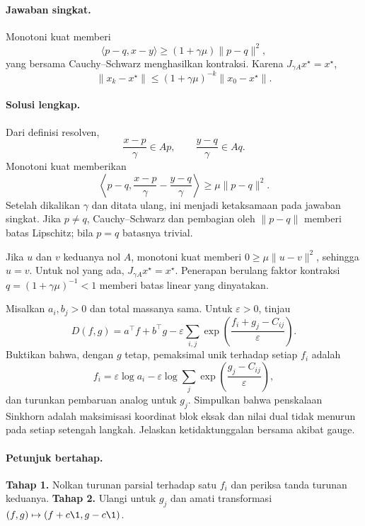 \paragraph{Jawaban singkat.}
\label{orig03:final:answer:0006}
Monotoni kuat memberi
\[
 \langle p-q,x-y\rangle\ge(1+\gamma\mu)\lVert p-q\rVert^2,
\]
yang bersama Cauchy--Schwarz menghasilkan kontraksi. Karena
$J_{\gamma A}x^\star=x^\star$,
\[
 \lVert x_k-x^\star\rVert
 \le(1+\gamma\mu)^{-k}\lVert x_0-x^\star\rVert.
\]

\paragraph{Solusi lengkap.}
\label{orig03:final:solution:0006}
Dari definisi resolven,
\[
 \frac{x-p}{\gamma}\in Ap,
 \qquad
 \frac{y-q}{\gamma}\in Aq.
\]
Monotoni kuat memberikan
\[
 \left\langle p-q,\frac{x-p}{\gamma}-\frac{y-q}{\gamma}\right\rangle
 \ge\mu\lVert p-q\rVert^2.
\]
Setelah dikalikan $\gamma$ dan ditata ulang, ini menjadi ketaksamaan pada
jawaban singkat. Jika $p\ne q$, Cauchy--Schwarz dan pembagian oleh
$\lVert p-q\rVert$ memberi batas Lipschitz; bila $p=q$ batasnya trivial.

Jika $u$ dan $v$ keduanya nol $A$, monotoni kuat memberi
$0\ge\mu\lVert u-v\rVert^2$, sehingga $u=v$. Untuk nol yang ada,
$J_{\gamma A}x^\star=x^\star$. Penerapan berulang faktor kontraksi
$q=(1+\gamma\mu)^{-1}<1$ memberi batas linear yang dinyatakan.

\begin{exercise}
\label{orig03:final:exercise:0007}
Misalkan $a_i,b_j>0$ dan total massanya sama. Untuk $\varepsilon>0$, tinjau
\[
 D(f,g)=a^\top f+b^\top g
 -\varepsilon\sum_{i,j}
 \exp\!\left(\frac{f_i+g_j-C_{ij}}{\varepsilon}\right).
\]
Buktikan bahwa, dengan $g$ tetap, pemaksimal unik terhadap setiap $f_i$ adalah
\[
 f_i=\varepsilon\log a_i-\varepsilon
 \log\sum_j\exp\!\left(\frac{g_j-C_{ij}}{\varepsilon}\right),
\]
dan turunkan pembaruan analog untuk $g_j$. Simpulkan bahwa penskalaan Sinkhorn
adalah maksimisasi koordinat blok eksak dan nilai dual tidak menurun pada
setiap setengah langkah. Jelaskan ketidaktunggalan bersama akibat gauge.
\end{exercise}

\paragraph{Petunjuk bertahap.}
\label{orig03:final:hint:0007}
\textbf{Tahap 1.} Nolkan turunan parsial terhadap satu $f_i$ dan periksa tanda
turunan keduanya.
\textbf{Tahap 2.} Ulangi untuk $g_j$ dan amati transformasi
$(f,g)\mapsto(f+c\1,g-c\1)$.

